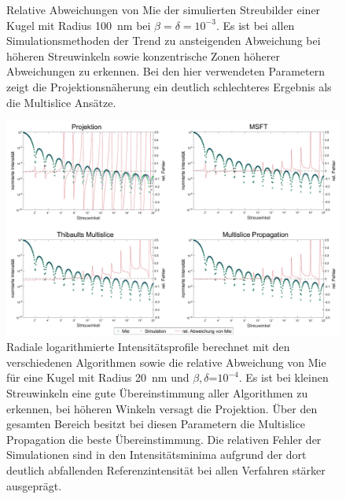 \begin{figure}
\begin{subfigure}[b]{0.48\textwidth}
	\end{subfigure}
	\caption[Relativer Fehler der Simulationen]{Relative Abweichungen von Mie der simulierten Streubilder einer Kugel mit Radius \SI{100}{nm} bei $\beta=\delta=10^{-3}$. Es ist bei allen Simulationsmethoden der Trend zu ansteigenden Abweichung bei höheren Streuwinkeln sowie konzentrische Zonen höherer Abweichungen zu erkennen. Bei den hier verwendeten Parametern zeigt die Projektionsnäherung ein deutlich schlechteres Ergebnis als die Multislice Ansätze.}
	\label{fig:relerror}
\end{figure}

\clearpage
\begin{figure} %
	\centering
	\includegraphics[width=1\textwidth]{images/fig_sim_profile.pdf}
	\captionsetup{width=0.95\textwidth}
	\caption[Radiale Profile]{Radiale logarithmierte Intensitätsprofile berechnet mit den verschiedenen Algorithmen sowie die relative Abweichung von Mie für eine Kugel mit Radius \SI{20}{nm} und $\beta,\delta$=$10^{-4}$. Es ist bei kleinen Streuwinkeln eine gute Übereinstimmung aller Algorithmen zu erkennen, bei höheren Winkeln versagt die Projektion. Über den gesamten Bereich besitzt bei diesen Parametern die Multislice Propagation die beste Übereinstimmung. Die relativen Fehler der Simulationen sind in den Intensitätsminima aufgrund der dort deutlich abfallenden Referenzintensität bei allen Verfahren stärker ausgeprägt.}
	\label{fig:profil}
\end{figure}
\clearpage

